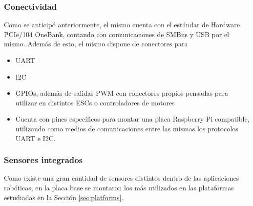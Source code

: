 \subsubsection{Conectividad}
Como se anticipó anteriormente, el mismo cuenta con el estándar de Hardware PCIe/104 OneBank, contando con comunicaciones de SMBus y USB por el mismo. Además de esto, el mismo dispone de conectores para
\begin{itemize}
    \item UART
    \item I2C
    \item GPIOs, además de salidas PWM con conectores propios pensadas para utilizar en distintos ESCs o controladores de motores
    \item Cuenta con pines específicos para montar una placa Raspberry Pi compatible, utilizando como medios de comunicaciones entre las mismas los protocolos UART e I2C.
\end{itemize}

\subsubsection{Sensores integrados}
Como existe una gran cantidad de sensores distintos dentro de las aplicaciones robóticas, en la placa base se montaron los más utilizados en las plataformas estudiadas en la Sección \ref{sec:platforms}.
